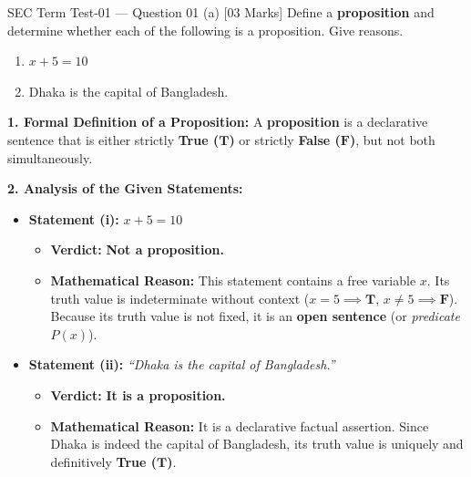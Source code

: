 \documentclass[11pt,a4paper]{article}
\begin{document}
\begin{exambox}[before skip=3pt, after skip=6pt]{SEC Term Test-01 --- Question 01 (a) \hfill [03 Marks]}
\Qlabel
Define a \textbf{proposition} and determine whether each of the following is a proposition. Give reasons.
\begin{enumerate}[label=\roman*), topsep=1pt, itemsep=1pt, parsep=0pt]
    \item $x + 5 = 10$
    \item Dhaka is the capital of Bangladesh.
\end{enumerate}

\tcblower

\Alabel
\textbf{1. Formal Definition of a Proposition:}
A \textbf{proposition} is a declarative sentence that is either strictly \textbf{True ($\mathbf{T}$)} or strictly \textbf{False ($\mathbf{F}$)}, but not both simultaneously.

\smallskip
\textbf{2. Analysis of the Given Statements:}

\begin{itemize}[leftmargin=1.5em, topsep=1pt, itemsep=2pt, parsep=0pt]
    \item \textbf{Statement (i):} $x + 5 = 10$
    \begin{itemize}[topsep=1pt, itemsep=1pt]
        \item \textbf{Verdict:} \textbf{\color{coral}Not a proposition.}
        \item \textbf{Mathematical Reason:} This statement contains a free variable $x$. Its truth value is indeterminate without context ($x=5 \implies \mathbf{T}$, $x \neq 5 \implies \mathbf{F}$). Because its truth value is not fixed, it is an \textbf{open sentence} (or \textit{predicate} $P(x)$).
    \end{itemize}
    
    \item \textbf{Statement (ii):} \textit{``Dhaka is the capital of Bangladesh.''}
    \begin{itemize}[topsep=1pt, itemsep=1pt]
        \item \textbf{Verdict:} \textbf{\color{teal}It is a proposition.}
        \item \textbf{Mathematical Reason:} It is a declarative factual assertion. Since Dhaka is indeed the capital of Bangladesh, its truth value is uniquely and definitively \textbf{True ($\mathbf{T}$)}.
    \end{itemize}
\end{itemize}
\end{exambox}
\end{document}
